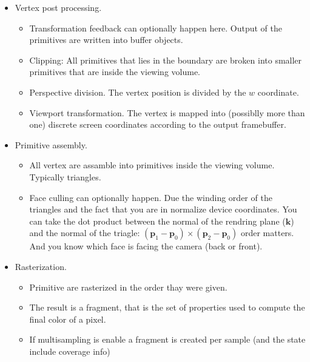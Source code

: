 \begin{itemize}
\begin{itemize}
 \end{itemize}

 \item Vertex post processing.
 \begin{itemize}
  \item Transformation feedback can optionally happen here. Output of the primitives are written into buffer objects.
  \item Clipping: All primitives that lies in the boundary are broken into smaller primitives that are inside the viewing volume.
  \item Perspective division. The vertex position is divided by the $w$ coordinate.
  \item Viewport transformation. The vertex is mapped into (possiblly more than one) discrete screen coordinates according to the output framebuffer.
 \end{itemize}

 \item Primitive assembly.
 \begin{itemize}
  \item All vertex are assamble into primitives inside the viewing volume. Typically triangles.
  \item Face culling can optionally happen. Due the winding order of the triangles and the fact that you are in normalize device coordinates. You can take the dot product between the normal of the rendring plane ($\mathbf{k}$) and the normal of the triagle: $(\mathbf{p}_1 - \mathbf{p}_0) \times (\mathbf{p}_2 - \mathbf{p}_0)$ order matters. And you know which face is facing the camera (back or front).
 \end{itemize}

 \item Rasterization.
 \begin{itemize}
  \item Primitive are rasterized in the order thay were given.
  \item The result is a fragment, that is the set of properties used to compute the final color of a pixel.
  \item If multisampling is enable a fragment is created per sample (and the state include coverage info)
 \end{itemize}


\end{itemize}
